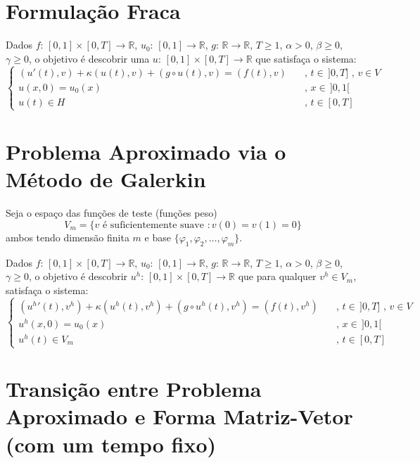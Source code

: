 \documentclass[a4paper]{article}
\newcommand{\typ}{:\,}
\newcommand{\vphi}{\varphi}
\begin{document}
\section{Formulação Fraca}

Dados
\(f \typ [0, 1] \times [0, T] \to \mathbb{R}\),
\(u_0 \typ [0, 1] \to \mathbb{R}\),
\(g \typ \mathbb{R} \to \mathbb{R}\),
\(T \ge 1\),
\(\alpha > 0\),
\(\beta \ge 0\),
\(\gamma \ge 0\),
o objetivo é descobrir
uma \(u \typ [0, 1] \times [0, T] \to \mathbb{R}\)
que satisfaça o sistema:
\[ \begin{cases}
    (u'(t), v)
    + \kappa(u(t), v)
    + (g \circ u(t), v)
    = (f(t), v)
        &\quad\text{, } t \in \,]0, T] \text{ , } v \in V
    \\
    u(x, 0) = u_0(x)
        &\quad\text{, } x \in \,]0, 1[
    \\
    u(t) \in H
        &\quad\text{, } t \in [0, T]
\end{cases} \]

\section{Problema Aproximado via o Método de Galerkin}

Seja o espaço das funções de teste (funções peso)
\[
    V_m = \{
        v \text{ é suficientemente suave } : v(0) = v(1) = 0
    \}
\]
ambos tendo dimensão finita \(m\)
e base \(\{ \vphi_1, \vphi_2, \dots, \vphi_m\}\).

Dados
\(f \typ [0, 1] \times [0, T] \to \mathbb{R}\),
\(u_0 \typ [0, 1] \to \mathbb{R}\),
\(g \typ \mathbb{R} \to \mathbb{R}\),
\(T \ge 1\),
\(\alpha > 0\),
\(\beta \ge 0\),
\(\gamma \ge 0\),
o objetivo é descobrir \(u^h \typ [0, 1] \times [0, T] \to \mathbb{R}\)
que para qualquer \(v^h \in V_m\),
satisfaça o sistema:
\[ \begin{cases}
    (u^h{}'(t), v^h)
    + \kappa(u^h(t), v^h)
    + (g \circ u^h(t), v^h)
    = (f(t), v^h)
        &\quad\text{, } t \in \,]0, T] \text{ , } v \in V
    \\
    u^h(x, 0) = u_0(x)
        &\quad\text{, } x \in \,]0, 1[
    \\
    u^h(t) \in V_m
        &\quad\text{, } t \in [0, T]
\end{cases} \]

\section{Transição entre Problema Aproximado e Forma Matriz-Vetor (com um tempo fixo)}
\end{document}
